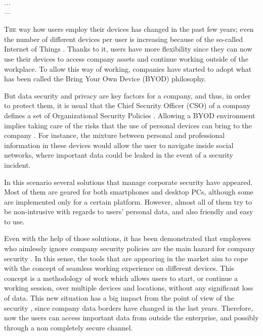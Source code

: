 \label{chap:byodSotA} 

\begin{flushright}{\slshape
   ... } \\ \medskip
    --- {}
\end{flushright}

\minitoc\mtcskip
\vfill

\lettrine{T}{he} way how users employ their devices has changed in the past few years; even the number of different devices per user is increasing because of the so-called Internet of Things \cite{weber2010internet}. Thanks to it, users have more flexibility since they can now use their devices to access company assets and continue working outside of the workplace. To allow this way of working, companies have started to adopt what has been called the Bring Your Own Device (BYOD) philosophy.

But data security and privacy are key factors for a company, and thus, in order to protect them, it is usual that the Chief Security Officer (CSO) of a company defines a set of Organizational Security Policies \cite{Opp_Security11}. Allowing a BYOD environment implies taking care of the risks that the use of personal devices can bring to
the company \cite{gangula2013survey}. For instance, the mixture between personal and professional information in these devices would allow the user to navigate inside social networks, where important data could be leaked in the event of a security incident.  

In this scenario several solutions that manage corporate security have appeared. Most of them are geared for both smartphones and desktop PCs, although some are implemented only for a certain platform. However, almost all of them try to be non-intrusive with regards to users' personal data, and also friendly and easy to use.

Even with the help of those solutions, it has been demonstrated that employees who aimlessly ignore company security policies are the main hazard for company security \cite{Adams_Users05}. In this sense, the tools that are appearing in the market aim to cope with the concept of seamless working experience on different devices. This concept is a methodology of work which allows users to start, or continue a working session, over multiple devices and locations, without any significant loss of data. This new situation has a big impact from the point of view of the security \cite{Schu_SecPatterns05}, since company data borders have changed in the last years. Therefore, now the users can access important data from outside the enterprise, and possibly through a non completely secure channel.

